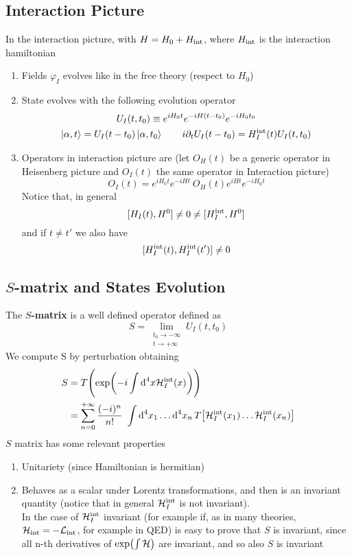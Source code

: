 \documentclass[TheoreticalPhy_ModB.tex]{subfiles}
\begin{document}
\subsection{Interaction Picture}
In the interaction picture, with $H = H_0 + H_{\textup{int}}$, where $H_{\textup{int}}$ is the interaction hamiltonian\\
\begin{enumerate}
\item Fields $\varphi_I$ evolves like in the free theory (respect to $H_0$)
\item State evolves with the following evolution operator 
	\begin{gather}
	U_I(t, t_0) \equiv e^{iH_0t} e^{-iH(t-t_0)} e^{-iH_0t_0} \notag \\
	\ket{\alpha, t} = U_I (t - t_0) \ket{\alpha, t_0}
	\qquad
	i \partial_t U_I (t-t_0) = H_I^{\textup{int}}(t) U_I(t, t_0) \notag
	\end{gather}
\item Operators in interaction picture are (let $O_H(t)$ be a generic operator in Heisenberg picture and $O_I(t)$ the same operator in Interaction picture)
	\[O_I(t) = e^{iH_0t}e^{-iHt} \ O_H(t) e^{iHt} e^{-iH_0t}\]
	Notice that, in general
	\[
	[H_I(t), H^0] \ne 0 \ne [H_I^{\textup{int}}, H^0]
	\]
	and if $t \ne t'$ we also have
	\[
	[H_I^{\textup{int}}(t), H_I^{\textup{int}}(t')] \ne 0
	\]
\end{enumerate}

\subsection{$S$-matrix and States Evolution}
The \textbf{$S$-matrix} is a well defined operator defined as
\[
S = \lim_{\substack{t_0 \to -\infty \\ t \to +\infty}} U_I(t, t_0)
\]
We compute S by perturbation obtaining
\[
\begin{split}
S 	& = T \Biggl( \exp \biggl( -i \int \textup{d}^4 x \mathcal{H}_I^{\textup{int}}(x) \biggr) \Biggr) \\
	& = \sum_{n=0}^{+\infty} \frac{(-i)^n}{n!} \ \int \textup{d}^4 x_1 \dots \textup{d}^4 x_n \, T\big[\mathcal{H}_I^{\textup{int}}(x_1) \dots \mathcal{H}_I^{\textup{int}}(x_n)\big]
\end{split}
\]
$S$ matrix has some relevant properties
\begin{enumerate}
\item{Unitariety (since Hamiltonian is hermitian)}
\item{Behaves as a scalar under Lorentz transformations, and then is an invariant quantity (notice that in general }$\mathcal{H}_I^{\textup{int}}$ is not invariant).\\
	{\small In the case of $\mathcal{H}_I^{\textup{int}}$ invariant (for example if, as in many theories, $\mathcal{H}_{\textup{int}} = -\mathcal{L}_{\textup{int}}$, for example in QED) is easy to prove that $S$ is invariant, since all n-th derivatives of $\exp( \int \mathcal{H})$ are invariant, and so also $S$ is invariant}
\end{enumerate}
\end{document}

